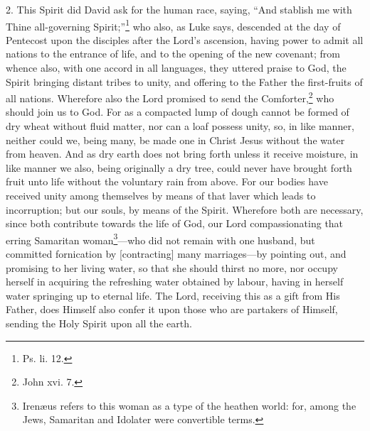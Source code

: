 2. This Spirit did David ask for the human race, saying, “And stablish me with Thine all-governing Spirit;”\footnote{Ps. li. 12.} who also, as Luke says, descended at the day of Pentecost upon the disciples after the Lord’s ascension, having power to admit all nations to the entrance of life, and to the opening of the new covenant; from whence also, with one accord in all languages, they uttered praise to God, the Spirit bringing distant tribes to unity, and offering to the Father the first-fruits of all nations. Wherefore also the Lord promised to send the Comforter,\footnote{John xvi. 7.} who should join us to God. For as a compacted lump of dough cannot be formed of dry wheat  without fluid matter, nor can a loaf possess unity, so, in like manner, neither could we, being many, be made one in Christ Jesus without the water from heaven. And as dry earth does not bring forth unless it receive moisture, in like manner we also, being originally a dry tree, could never have brought forth fruit unto life without the voluntary rain from above. For our bodies have received unity among themselves by means of that laver which leads to incorruption; but our souls, by means of the Spirit. Wherefore both are necessary, since both contribute towards the life of God, our Lord compassionating that erring Samaritan woman\footnote{Irenæus refers to this woman as a type of the heathen world: for, among the Jews, Samaritan and Idolater were convertible terms.}—who did not remain with one husband, but committed fornication by [contracting] many marriages—by pointing out, and promising to her living water, so that she should thirst no more, nor occupy herself in acquiring the refreshing water obtained by labour, having in herself water springing up to eternal life. The Lord, receiving this as a gift from His Father, does Himself also confer it upon those who are partakers of Himself, sending the Holy Spirit upon all the earth.


